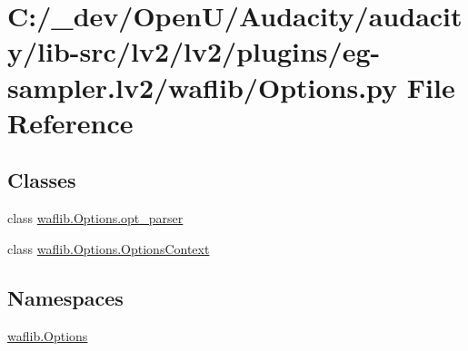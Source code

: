 \hypertarget{lv2_2plugins_2eg-sampler_8lv2_2waflib_2_options_8py}{}\section{C\+:/\+\_\+dev/\+Open\+U/\+Audacity/audacity/lib-\/src/lv2/lv2/plugins/eg-\/sampler.lv2/waflib/\+Options.py File Reference}
\label{lv2_2plugins_2eg-sampler_8lv2_2waflib_2_options_8py}
\subsection*{Classes}
\begin{DoxyCompactItemize}
\item 
class \hyperlink{classwaflib_1_1_options_1_1opt__parser}{waflib.\+Options.\+opt\+\_\+parser}
\item 
class \hyperlink{classwaflib_1_1_options_1_1_options_context}{waflib.\+Options.\+Options\+Context}
\end{DoxyCompactItemize}
\subsection*{Namespaces}
\begin{DoxyCompactItemize}
\item 
 \hyperlink{namespacewaflib_1_1_options}{waflib.\+Options}
\end{DoxyCompactItemize}
